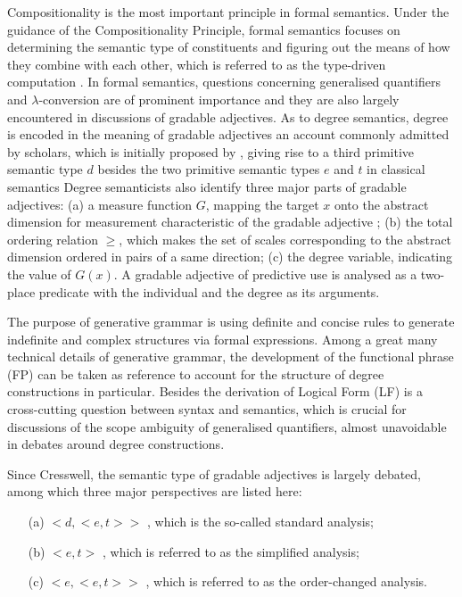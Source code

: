 \documentclass{ctexart}
\let \cite \parencite
\begin{document}
\noindent
Compositionality is the most important principle in formal semantics. Under the guidance of the Compositionality Principle, formal semantics focuses on determining the semantic type of constituents and figuring out the means of how they combine with each other, which is referred to as the type-driven computation \cite{pan1998}. In formal semantics, questions concerning generalised quantifiers and $\lambda$-conversion are of prominent importance and they are also largely encountered in discussions of gradable adjectives. As to degree semantics, degree is encoded in the meaning of gradable adjectives an account commonly admitted by scholars, which is initially proposed by \cite{cresswell1976}, giving rise to a third primitive semantic type $d$ besides the two primitive semantic types $e$ and $t$ in classical semantics Degree semanticists also identify three major parts of gradable adjectives: (a) a measure function $G$, mapping the target $x$ onto the abstract dimension for measurement characteristic of the gradable adjective \cite{bartsch1974}; (b) the total ordering relation $\geq$, which makes the set of scales corresponding to the abstract dimension ordered in pairs of a same direction; (c) the degree variable, indicating the value of $G(x)$. A gradable adjective of predictive use is analysed as a two-place predicate with the individual and the degree as its arguments.

The purpose of generative grammar is using definite and concise rules to generate indefinite and complex structures via formal expressions. Among a great many technical details of generative grammar, the development of the functional phrase (FP) can be taken as reference to account for the structure of degree constructions in particular. Besides the derivation of Logical Form (LF) is a cross-cutting question between syntax and semantics, which is crucial for discussions of the scope ambiguity of generalised quantifiers, almost unavoidable in debates around degree constructions.

Since Cresswell, the semantic type of gradable adjectives is largely debated, among which three major perspectives are listed here: 

\begin{itemize}
    \item[(a)] $<d,<e,t>>$ \cite{von1984a}, which is the so-called standard analysis; 
    \item[(b)] $<e,t>$ \cite{kennedy1997}, which is referred to as the simplified analysis;
    \item[(c)] $<e,<e,t>>$ \cite{rett2008}, which is referred to as the order-changed analysis.
\end{itemize}
\end{document}
